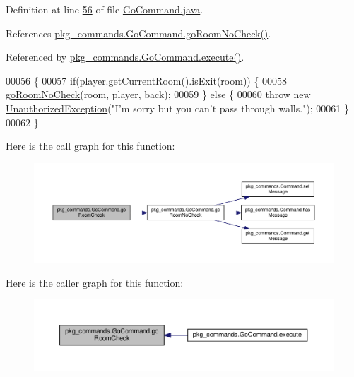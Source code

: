 Definition at line \hyperlink{GoCommand_8java_source_l00056}{56} of file \hyperlink{GoCommand_8java_source}{Go\-Command.\-java}.



References \hyperlink{GoCommand_8java_source_l00071}{pkg\-\_\-commands.\-Go\-Command.\-go\-Room\-No\-Check()}.



Referenced by \hyperlink{GoCommand_8java_source_l00032}{pkg\-\_\-commands.\-Go\-Command.\-execute()}.


\begin{DoxyCode}
00056                                                                                                            
                                       \{
00057         \textcolor{keywordflow}{if}(player.getCurrentRoom().isExit(room)) \{
00058             \hyperlink{classpkg__commands_1_1GoCommand_a210afbc5f3ef34d3ad5759d853c8f8c2}{goRoomNoCheck}(room, player, back);
00059         \} \textcolor{keywordflow}{else} \{
00060             \textcolor{keywordflow}{throw} \textcolor{keyword}{new} \hyperlink{classpkg__exceptions_1_1UnauthorizedException}{UnauthorizedException}(\textcolor{stringliteral}{"I'm sorry but you can't pass through
       walls."});
00061         \}
00062     \}
\end{DoxyCode}


Here is the call graph for this function\-:
\nopagebreak
\begin{figure}[H]
\begin{center}
\leavevmode
\includegraphics[width=350pt]{classpkg__commands_1_1GoCommand_acbf1aa81fa5b1aef7cafb8b4e3ace3a9_cgraph}
\end{center}
\end{figure}




Here is the caller graph for this function\-:
\nopagebreak
\begin{figure}[H]
\begin{center}
\leavevmode
\includegraphics[width=350pt]{classpkg__commands_1_1GoCommand_acbf1aa81fa5b1aef7cafb8b4e3ace3a9_icgraph}
\end{center}
\end{figure}


